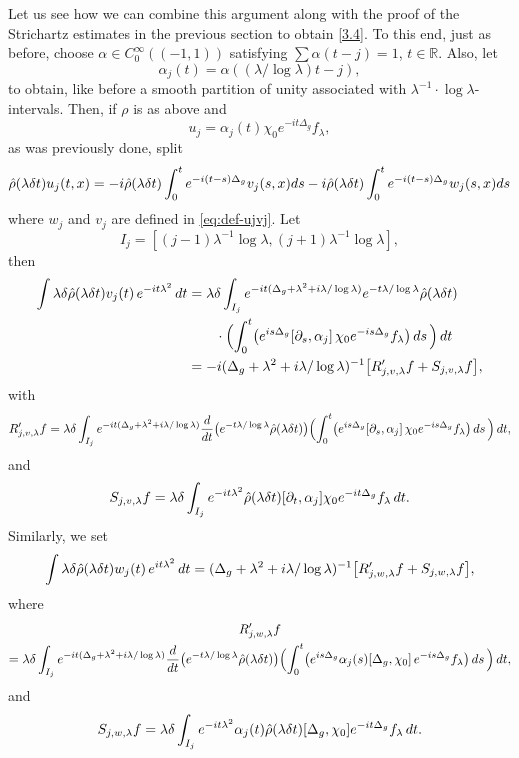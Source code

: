 \documentclass[10pt]{amsart}
\newcommand{\la}{\lambda}
\newcommand{\1}{{\bf 1}}
\begin{document}
Let us see how we can combine this argument along with the proof of the Strichartz estimates in the previous section to obtain \eqref{3.4}.   To this end,
just as before,
choose $\alpha \in C^\infty_0((-1,1))$ satisfying $\sum \alpha(t-j)=1$, $t\in {\mathbb R}$.  Also, let
$$\alpha_j(t)=\alpha((\la/\log\la)t-j),$$
to obtain, like before a smooth partition of unity associated with $\la^{-1}\cdot \log\la$-intervals.  Then, if $\rho$ is as above and 
$$u_j =\alpha_j(t) \chi_0 e^{-it\Delta_g}f_\la,$$
 as was previously done, split
$$\Hat \rho(\la\delta t) u_j(t,x)=-i\Hat \rho(\la\delta t) \int_0^t e^{-i(t-s)\Delta_g}v_j(s,x)ds-i\Hat \rho(\la\delta t) \int_0^t e^{-i(t-s )\Delta_g} w_j(s,x)d s$$
where {$w_j$} and $v_j$ are defined in \eqref{eq:def-ujvj}. Let
$$I_j=[(j-1)\la^{-1}\log\la, (j+1)\la^{-1}\log\la],$$
then
\begin{align*}
\int \la\delta\Hat \rho(\la\delta t)
v_j(t) \, e^{-it\la^2}\, dt &=\la\delta\int_{I_j}
e^{-it(\Delta_g+\la^2+i\la/\log\la)} e^{-t\la/\log\la}\Hat \rho(\la\delta t)\\
&\qquad\cdot
\Bigl( \int_0^t \bigl( e^{is\Delta_g}[ \partial_s, \alpha_j] \, \chi_0 e^{-is\Delta_g}f_\la \bigr) \, ds \, \Bigr) \, dt
\\
&=-i(\Delta_g+\la^2+i\la/\log\la)^{-1} \bigl[ R'_{j,v,\la}f  +S_{j,v,\la}f\bigr],
\end{align*}
with
$$R'_{j,v,\la}f = \la\delta\int_{I_j} e^{-it(\Delta_g+\la^2+i\la/\log\la)}  \frac{d}{dt}\bigl(e^{-t\la/\log\la}\Hat \rho(\la\delta t)\bigr)
\Bigl( \int_0^t \bigl( e^{is\Delta_g} [\partial_s,\alpha_j ] \, \chi_0 e^{-is\Delta_g}f_\la \bigr) \, ds \, \Bigr) \, dt,
$$
and
$$S_{j,v,\la}f =\la\delta\int_{I_j} e^{-it\la^2} \Hat \rho(\la\delta t) [\partial_t, \alpha_j ] \chi_0 e^{-it\Delta_g}f_\la \, dt.$$
Similarly, we set
$$\int \la\delta\Hat \rho(\la\delta t)
w_j(t) \, e^{it\la^2}\, dt
={(\Delta_g+\la^2+i\la/\log\la)^{-1} }
\bigl[ R'_{j,w,\la}f  +S_{j,w,\la}f\bigr],$$
where
\begin{multline*}
R'_{j,w,\la}f 
\\
= \la\delta\int_{I_j} e^{-it(\Delta_g+\la^2+i\la/\log\la)}  \frac{d}{dt}\bigl(e^{-t\la/\log\la}\Hat \rho(\la\delta t)\bigr)
\Bigl( \int_0^t \bigl( e^{is\Delta_g} \alpha_j(s)[\Delta_g,\chi_0] \,  e^{-is\Delta_g}f_\la \bigr) \, ds \, \Bigr) \, dt,
\end{multline*}
and
$$S_{j,w,\la}f =\la\delta\int_{I_j} e^{-it\la^2} \alpha_j(t) \Hat \rho(\la\delta t)  [\Delta_g,\chi_0] e^{-it\Delta_g}f_\la \, dt.$$
\end{document}
